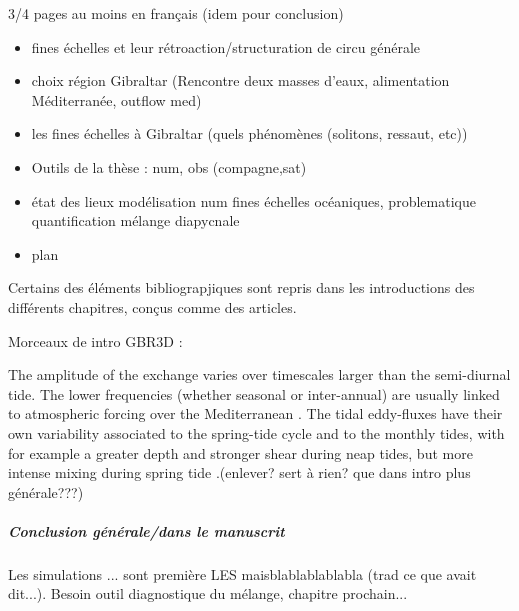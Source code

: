 \hypersetup{pdfborder=0 0 0}

3/4 pages au moins en français (idem pour conclusion)
\begin{itemize}
\item fines échelles et leur rétroaction/structuration de circu générale
\item choix région Gibraltar (Rencontre deux masses d'eaux, alimentation Méditerranée, outflow med)
\item les fines échelles à Gibraltar (quels phénomènes (solitons, ressaut, etc))
\item Outils de la thèse : num, obs (compagne,sat)
\item état des lieux modélisation num fines échelles océaniques, problematique quantification mélange diapycnale
\item plan
\end{itemize}

Certains des éléments bibliograpjiques sont repris dans les introductions des différents chapitres, conçus comme des articles.





Morceaux de intro GBR3D : 

The amplitude of the exchange varies over timescales larger than the semi-diurnal tide. The lower frequencies (whether seasonal or inter-annual) are usually linked to atmospheric forcing over the Mediterranean \citep{sanchez-roman_2012}. The tidal eddy-fluxes have their own variability associated to the spring-tide cycle and to the monthly tides, with for example a greater depth and stronger shear during neap tides, but more intense mixing during spring tide \citep{naranjo_2014,vargas_2006}.\color{red}(enlever? sert à rien? que dans intro plus générale???)\color{black}


\subparagraph{Conclusion générale/dans le manuscrit}
Les simulations ... sont première LES maisblablablablabla (trad ce que avait dit...). Besoin outil diagnostique du mélange, chapitre prochain...
